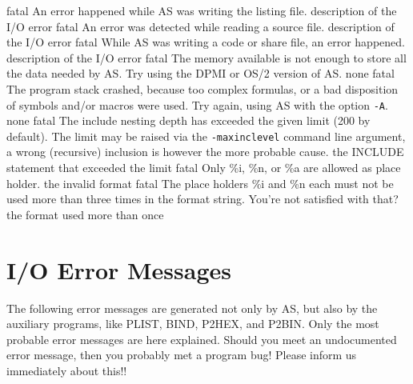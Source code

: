 \documentclass[12pt,twoside]{report}
\newcommand{\tty}[1]{{\tt #1}}
\newcommand{\asname}{{AS}}
\begin{document}
\begin{description}
               {fatal}
               {An error happened while \asname{} was writing the listing file.}
               {description of the I/O error}
               {fatal}
               {An error was detected while reading a source file.}
               {description of the I/O error}
               {fatal}
               {While \asname{} was writing a code or share file, an error happened.}
               {description of the I/O error}
               {fatal}
               {The memory available is not enough to store all the data
                needed by \asname{}. Try using the DPMI or OS/2 version of \asname{}.}
               {none}
               {fatal}
               {The program stack crashed, because too complex formulas, or
                a bad disposition of symbols and/or macros were used. Try
                again, using \asname{} with the option \tty{-A}.}
               {none}
               {fatal}
               {The include nesting depth has exceeded the given limit (200
                by default). The limit may be raised via the {\tt -maxinclevel}
                command line argument, a wrong (recursive) inclusion is however
                the more probable cause.}
               {the INCLUDE statement that exceeded the limit}
               {fatal}
               {Only  \%i, \%n, or \%a are allowed as place holder.}
               {the invalid format}
               {fatal}
               {The place holders \%i and \%n each must not be used more than
                three times in the format string.  You're not satisfied with that?}
               {the format used more than once}
\end{description}


\cleardoublepage
\chapter{I/O Error Messages}

The following error messages are generated not only by \asname{}, but also by
the auxiliary programs, like PLIST, BIND, P2HEX, and P2BIN. Only the most
probable error messages are here explained. Should you meet an undocumented
error message, then you probably met a program bug! Please inform us
immediately about this!!
\end{document}
